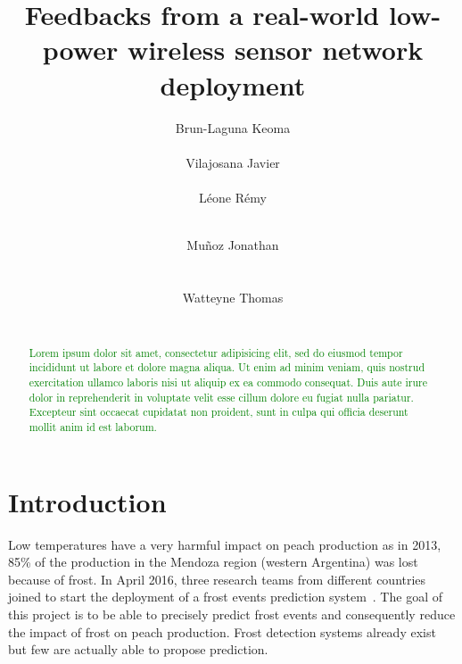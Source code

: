 \documentclass{sig-alternate}
\newcommand{\lorem}               {\textcolor{green}{Lorem ipsum dolor sit amet, consectetur adipisicing elit, sed do eiusmod tempor incididunt ut labore et dolore magna aliqua. Ut enim ad minim veniam, quis nostrud exercitation ullamco laboris nisi ut aliquip ex ea commodo consequat. Duis aute irure dolor in reprehenderit in voluptate velit esse cillum dolore eu fugiat nulla pariatur. Excepteur sint occaecat cupidatat non proident, sunt in culpa qui officia deserunt mollit anim id est laborum.}}
\begin{document}
\title{Feedbacks from a real-world low-power wireless sensor network deployment}

\author{
  \alignauthor Brun-Laguna Keoma\\
    \\
  \alignauthor Vilajosana Javier\\
    \\
  \alignauthor Léone Rémy \\
    \\
  \and
  \alignauthor Muñoz Jonathan\\
    \\
    \\
  \alignauthor Watteyne Thomas \\
    \\
}

\maketitle

\begin{abstract}
\lorem
\end{abstract}


\section{Introduction}
\label{sec:intro}


Low temperatures have a very harmful impact on peach production as in 2013, 85\% of the production in the Mendoza region (western Argentina) was lost because of frost.
In April 2016, three research teams from different countries joined to start the deployment of a frost events prediction system~\cite{watteyne16peach}.
The goal of this project is to be able to precisely predict frost events and consequently reduce the impact of frost on peach production.
Frost detection systems already exist but few are actually able to propose prediction.
\end{document}
